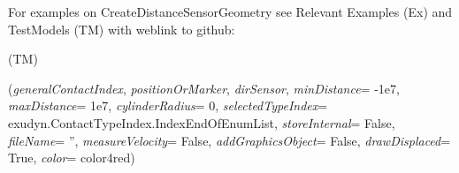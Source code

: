 %
\noindent For examples on CreateDistanceSensorGeometry see Relevant Examples (Ex) and TestModels (TM) with weblink to github:
\bi
 \item \footnotesize {} (TM)
\ei

%
\begin{flushleft}
\label{sec:mainsystemextensions:CreateDistanceSensor}
({\it generalContactIndex}, {\it positionOrMarker}, {\it dirSensor}, {\it minDistance}= -1e7, {\it maxDistance}= 1e7, {\it cylinderRadius}= 0, {\it selectedTypeIndex}= exudyn.ContactTypeIndex.IndexEndOfEnumList, {\it storeInternal}= False, {\it fileName}= '', {\it measureVelocity}= False, {\it addGraphicsObject}= False, {\it drawDisplaced}= True, {\it color}= color4red)
\end{flushleft}
\setlength{\itemindent}{0.7cm}
